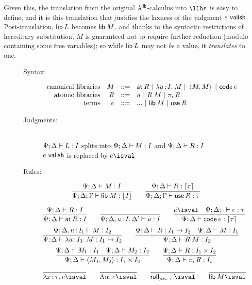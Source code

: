\documentclass[11pt]{article}
\begin{document}
Given this, the translation from the original $\lambda^{\textsf{lib}}$-calculus into $\llhs$ is
easy to define, and it is this translation that justifies the laxness of the
judgment $e ~\textsf{valish}$. Post-translation, $\textsf{lib}\:{L}$ becomes $\textsf{lib}\:{M}$, and thanks
to the syntactic restrictions of hereditary substitution, $M$ is guaranteed not
to require further reduction (modulo containing some free variables); so while
$\textsf{lib}\:{L}$ may not \emph{be} a value, it \emph{translates} to one.


\begin{figure}
  \centering
  \begin{description}
    \item[Syntax:]
      \[\begin{array}{rrcl}
        \text{canonical libraries} &
        M &::=& \textsf{at}\:{R} ~|~ \lambda u \mathop{:} I .\: M ~|~ \left\langle M,M\right\rangle ~|~ \textsf{code}\:{e}\\
        \text{atomic libraries} & R &::=& u ~|~ R \; M ~|~ \pi_{i} \, R\\
        \text{terms} & e &::=& ... ~|~ \textsf{lib}\:{M} ~|~ \textsf{use}\:{R}
      \end{array}\]

    \item[Judgments:]\hfill\\
      $\Psi;\Delta \vdash L : I$ splits into $\Psi;\Delta \vdash M : I$ and $\Psi;\Delta
      \vdash R : I$\\
      $e ~\textsf{valish}$ is replaced by $e \isval$

    \item[Rules:]
      \[
      \infer{\Psi;\D;\G \ent \lib{M} \isa \dn{I}}{\Psi;\D \ent M \isa I} \qquad
      \infer{\Psi;\D;\G \ent \use{R} \isa \tau}{\Psi;\D \ent R \isa \up{\tau}}
      \]

      \[
      \infer{\Psi;\D \ent \at{R} \isa I}{\Psi;\D \ent R \isa I} \qquad
      \infer{\Psi;\D,u \of I,\D' \ent u \isa I}{} \qquad
      \infer{\Psi;\D \ent \code{e} \isa \up{\tau}}{
        e \isval &
        \Psi;\D;\ecx \ent e \isa \tau}
      \]\[
      \infer{\Psi;\D \ent \lam{u}{I_1}{M} \isa I_1 \to I_2}{
        \Psi;\D, u \of I_1 \ent M \isa I_2}
      \qquad
      \infer{\Psi;\D \ent R \ap M \isa I_2}{
        \Psi;\D \ent R \isa I_1 \to I_2 &
        \Psi;\D \ent M \isa I_1}
      \]\[
      \infer{\Psi;\D \ent \<M_1, M_2\> \isa I_1 \x I_2}{
        \Psi;\D \ent M_1 \isa I_1 &
        \Psi;\D \ent M_2 \isa I_2} \qquad
      \infer{\Psi;\D \ent \proj{i}{R} \isa I_i}{
        \Psi;\D \ent R \isa I_1 \x I_2}
      \]

      \[
      \infer{\lam{x}{\tau}{e} \isval}{} \qquad
      \infer{\Lam{\alpha}{e} \isval}{} \qquad
      \infer{\roll{\alpha}{\tau} \isval}{} \qquad
      \infer{\lib{M} \isval}{}
      \]


\end{description}
\end{figure}
\end{document}
